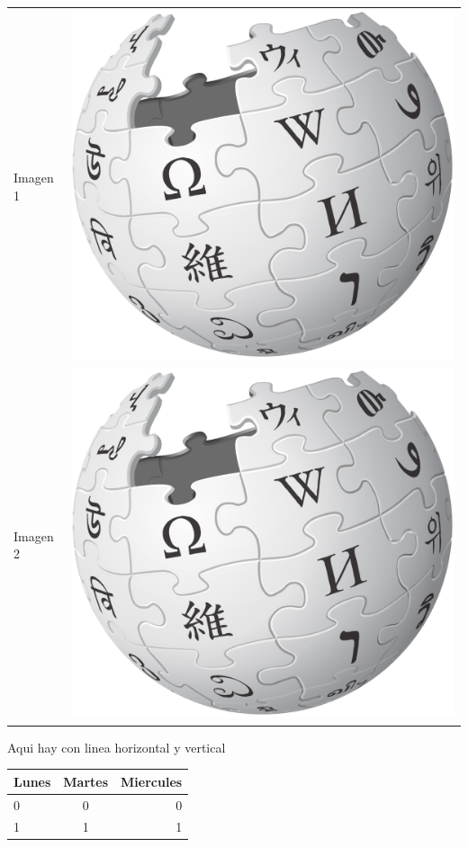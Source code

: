 \documentclass[12pt]{article}
\begin{document}
\begin{table}[!ht]
\centering
\begin{tabular}{|l||c|}
Imagen 1 &\includegraphics[scale=.05]{5figuras/wiki.png} \\
Imagen 2 &\includegraphics[scale=.05]{5figuras/wiki.png} \\

\end{tabular}
\end{table}

Aqui hay con linea horizontal y vertical

\begin{table}[!ht]
\begin{tabular}{|l|c|r|}
\hline
Lunes & Martes & Miercules \\
\hline
0 	  &		 0 & 	0\\
1	  &     1  & 1  \\
\hline
\end{tabular}

\end{table}
\end{document}
